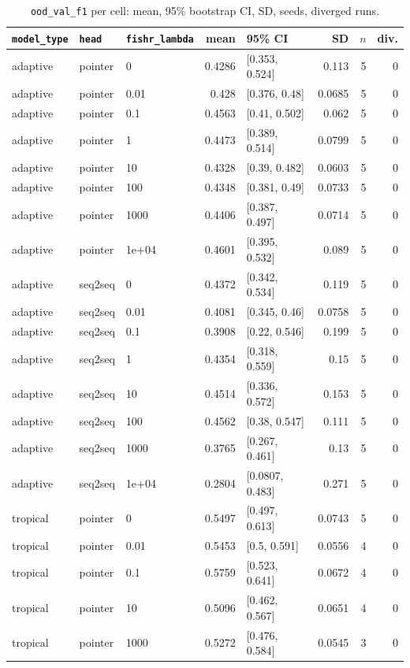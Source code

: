 \documentclass[10pt]{article}
\begin{document}
{\small
\begin{longtable}{lllrlrrr}
\caption{\texttt{ood\_val\_f1} per cell: mean, 95\% bootstrap CI, SD, seeds, diverged runs.}\label{tab:summary-ood_val_f1}\\
\toprule
\texttt{model\_type} & \texttt{head} & \texttt{fishr\_lambda} & mean & 95\% CI & SD & $n$ & div.\\
\midrule
\endhead
adaptive & pointer & 0 & 0.4286 & [0.353, 0.524] & 0.113 & 5 & 0\\
adaptive & pointer & 0.01 & 0.428 & [0.376, 0.48] & 0.0685 & 5 & 0\\
adaptive & pointer & 0.1 & 0.4563 & [0.41, 0.502] & 0.062 & 5 & 0\\
adaptive & pointer & 1 & 0.4473 & [0.389, 0.514] & 0.0799 & 5 & 0\\
adaptive & pointer & 10 & 0.4328 & [0.39, 0.482] & 0.0603 & 5 & 0\\
adaptive & pointer & 100 & 0.4348 & [0.381, 0.49] & 0.0733 & 5 & 0\\
adaptive & pointer & 1000 & 0.4406 & [0.387, 0.497] & 0.0714 & 5 & 0\\
adaptive & pointer & 1e+04 & 0.4601 & [0.395, 0.532] & 0.089 & 5 & 0\\
adaptive & seq2seq & 0 & 0.4372 & [0.342, 0.534] & 0.119 & 5 & 0\\
adaptive & seq2seq & 0.01 & 0.4081 & [0.345, 0.46] & 0.0758 & 5 & 0\\
adaptive & seq2seq & 0.1 & 0.3908 & [0.22, 0.546] & 0.199 & 5 & 0\\
adaptive & seq2seq & 1 & 0.4354 & [0.318, 0.559] & 0.15 & 5 & 0\\
adaptive & seq2seq & 10 & 0.4514 & [0.336, 0.572] & 0.153 & 5 & 0\\
adaptive & seq2seq & 100 & 0.4562 & [0.38, 0.547] & 0.111 & 5 & 0\\
adaptive & seq2seq & 1000 & 0.3765 & [0.267, 0.461] & 0.13 & 5 & 0\\
adaptive & seq2seq & 1e+04 & 0.2804 & [0.0807, 0.483] & 0.271 & 5 & 0\\
tropical & pointer & 0 & 0.5497 & [0.497, 0.613] & 0.0743 & 5 & 0\\
tropical & pointer & 0.01 & 0.5453 & [0.5, 0.591] & 0.0556 & 4 & 0\\
tropical & pointer & 0.1 & 0.5759 & [0.523, 0.641] & 0.0672 & 4 & 0\\
tropical & pointer & 10 & 0.5096 & [0.462, 0.567] & 0.0651 & 4 & 0\\
tropical & pointer & 1000 & 0.5272 & [0.476, 0.584] & 0.0545 & 3 & 0\\

\end{longtable}}
\end{document}
